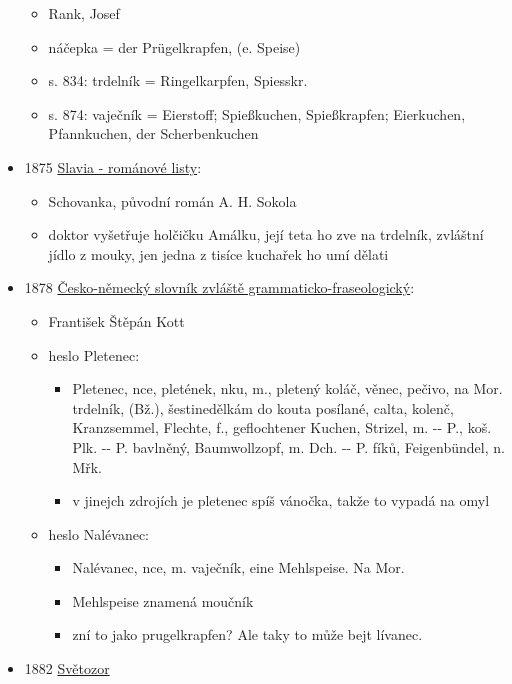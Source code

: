 \begin{itemize}
  \begin{itemize}
  \tightlist
  \item
    Rank, Josef
  \item
    náčepka = der Prügelkrapfen, (e. Speise)
  \item
    s. 834: trdelník = Ringelkarpfen, Spiesskr.
  \item
    s. 874: vaječník = Eierstoff; Spießkuchen, Spießkrapfen; Eierkuchen,
    Pfannkuchen, der Scherbenkuchen
  \end{itemize}
\item
  1875
  \href{https://www.google.cz/books/edition/Slavia/WrJiAAAAcAAJ?hl=cs&gbpv=1&dq=trdeln\%C3\%ADk&pg=PA312&printsec=frontcover}{Slavia
  - románové listy}:

  \begin{itemize}
  \tightlist
  \item
    Schovanka, původní román A. H. Sokola
  \item
    doktor vyšetřuje holčičku Amálku, její teta ho zve na trdelník,
    zvláštní jídlo z mouky, jen jedna z tisíce kuchařek ho umí dělati
  \end{itemize}
\item
  1878
  \href{https://www.google.cz/books/edition/\%C4\%8Cesko_n\%C4\%9Bmeck\%C3\%BD_slovn\%C3\%ADk_zvl\%C3\%A1\%C5\%A1t\%C4\%9B_gra/4r00AQAAMAAJ?hl=cs&gbpv=1&dq=trdeln\%C3\%ADk&pg=PA586&printsec=frontcover}{Česko-německý
  slovník zvláště grammaticko-fraseologický}:

  \begin{itemize}
  \tightlist
  \item
    František Štěpán Kott
  \item
    heslo Pletenec:

    \begin{itemize}
    \tightlist
    \item
      Pletenec, nce, pletének, nku, m., pletený koláč, věnec, pečivo, na
      Mor. trdelník, (Bž.), šestinedělkám do kouta posílané, calta,
      kolenč, Kranzsemmel, Flechte, f., geflochtener Kuchen, Strizel, m.
      -\/- P., koš. Plk. -\/- P. bavlněný, Baumwollzopf, m. Dch. -\/- P.
      fíků, Feigenbündel, n. Mřk.
    \item
      v jinejch zdrojích je pletenec spíš vánočka, takže to vypadá na
      omyl
    \end{itemize}
  \item
    heslo Nalévanec:

    \begin{itemize}
    \tightlist
    \item
      Nalévanec, nce, m. vaječník, eine Mehlspeise. Na Mor.
    \item
      Mehlspeise znamená moučník
    \item
      zní to jako prugelkrapfen? Ale taky to může bejt lívanec.
    \end{itemize}
  \end{itemize}
\item
  1882
  \href{https://ceskadigitalniknihovna.cz/uuid/uuid:ee6245d1-435d-11dd-b505-00145e5790ea}{Světozor}


\end{itemize}
